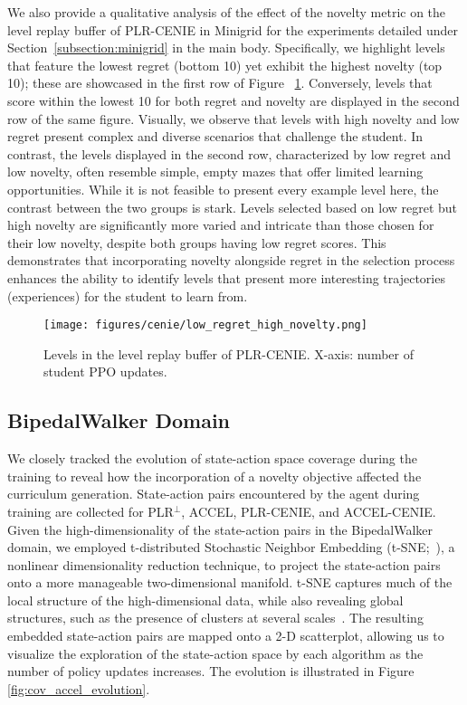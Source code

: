We also provide a qualitative analysis of the effect of the novelty metric on the level replay buffer of PLR-CENIE in Minigrid for the experiments detailed under Section~\ref{subsection:minigrid} in the main body. Specifically, we highlight levels that feature the lowest regret (bottom 10) yet exhibit the highest novelty (top 10); these are showcased in the first row of Figure ~\ref{fig:low_regret_high_novelty}. Conversely, levels that score within the lowest 10 for both regret and novelty are displayed in the second row of the same figure. Visually, we observe that levels with high novelty and low regret present complex and diverse scenarios that challenge the student. In contrast, the levels displayed in the second row, characterized by low regret and low novelty, often resemble simple, empty mazes that offer limited learning opportunities. While it is not feasible to present every example level here, the contrast between the two groups is stark. Levels selected based on low regret but high novelty are significantly more varied and intricate than those chosen for their low novelty, despite both groups having low regret scores. This demonstrates that incorporating novelty alongside regret in the selection process enhances the ability to identify levels that present more interesting trajectories (experiences) for the student to learn from.
\begin{figure} [H]
    \centering
    \texttt{[image: figures/cenie/low\_regret\_high\_novelty.png]}
    \caption{Levels in the level replay buffer of PLR-CENIE. X-axis: number of student PPO updates.}
    \label{fig:low_regret_high_novelty}
\end{figure}


\subsection{BipedalWalker Domain} \label{section:bipedal-walker-extended}
We closely tracked the evolution of state-action space coverage during the training to reveal how the incorporation of a novelty objective affected the curriculum generation. State-action pairs encountered by the agent during training are collected for PLR$^\perp$, ACCEL, PLR-CENIE, and ACCEL-CENIE. Given the high-dimensionality of the state-action pairs in the BipedalWalker domain, we employed t-distributed Stochastic Neighbor Embedding (t-SNE;~\cite{van2008visualizing}), a nonlinear dimensionality reduction technique, to project the state-action pairs onto a more manageable two-dimensional manifold. t-SNE captures much of the local structure of the high-dimensional data, while also revealing global structures, such as the presence of clusters at several scales~\cite{van2008visualizing,wattenberg2016use}. The resulting embedded state-action pairs are mapped onto a 2-D scatterplot, allowing us to visualize the exploration of the state-action space by each algorithm as the number of policy updates increases. The evolution is illustrated in Figure \ref{fig:cov_accel_evolution}. 


